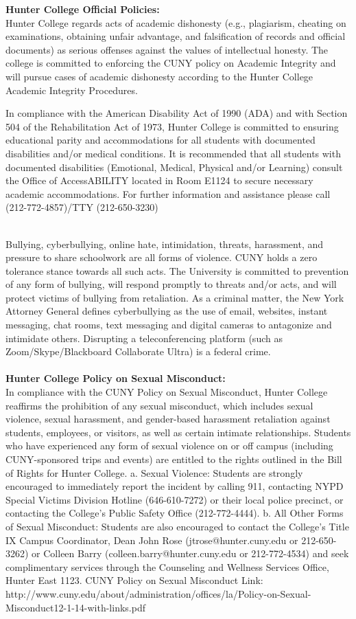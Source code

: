 \documentclass[a4paper]{article}
\begin{document}
\textbf{Hunter College Official Policies:}\\
Hunter College regards acts of academic dishonesty (e.g., plagiarism, cheating on examinations, obtaining
unfair advantage, and falsification of records and official documents) as serious offenses against the values of
intellectual honesty. The college is committed to enforcing the CUNY policy on Academic Integrity and will
pursue cases of academic dishonesty according to the Hunter College Academic Integrity Procedures.
\par In compliance with the American Disability Act of 1990 (ADA) and with Section 504 of the Rehabilitation
Act of 1973, Hunter College is committed to ensuring educational parity and accommodations for all students
with documented disabilities and/or medical conditions. It is recommended that all students with documented
disabilities (Emotional, Medical, Physical and/or Learning) consult the Office of AccessABILITY located in
Room E1124 to secure necessary academic accommodations. For further information and assistance please call
(212-772-4857)/TTY (212-650-3230)\\\\
\par Bullying, cyberbullying, online hate, intimidation, threats, harassment, and pressure to share schoolwork
are all forms of violence. CUNY holds a zero tolerance stance towards all such acts. The University
is committed to prevention of any form of bullying, will respond promptly to threats and/or acts, and
will protect victims of bullying from retaliation. As a criminal matter, the New York Attorney General
defines cyberbullying as the use of email, websites, instant messaging, chat rooms, text messaging and
digital cameras to antagonize and intimidate others. Disrupting a teleconferencing platform (such as
Zoom/Skype/Blackboard Collaborate Ultra) is a federal crime.\\\\
\textbf{Hunter College Policy on Sexual Misconduct:}\\
In compliance with the CUNY Policy on Sexual Misconduct, Hunter College reaffirms the prohibition of
any sexual misconduct, which includes sexual violence, sexual harassment, and gender-based harassment
retaliation against students, employees, or visitors, as well as certain intimate relationships. Students
who have experienced any form of sexual violence on or off campus (including CUNY-sponsored trips and
events) are entitled to the rights outlined in the Bill of Rights for Hunter College. a. Sexual Violence:
Students are strongly encouraged to immediately report the incident by calling 911, contacting NYPD
Special Victims Division Hotline (646-610-7272) or their local police precinct, or contacting the College’s
Public Safety Office (212-772-4444). b. All Other Forms of Sexual Misconduct: Students are also encouraged to contact the College’s Title IX Campus Coordinator, Dean John Rose (jtrose@hunter.cuny.edu or
212-650-3262) or Colleen Barry (colleen.barry@hunter.cuny.edu or 212-772-4534) and seek complimentary
services through the Counseling and Wellness Services Office, Hunter East 1123. CUNY Policy on Sexual
Misconduct Link: http://www.cuny.edu/about/administration/offices/la/Policy-on-Sexual-Misconduct12-1-14-with-links.pdf
\end{document}
